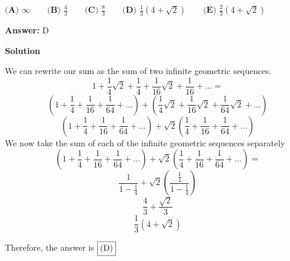 \begin{enumerate}
 $\textbf{(A) } \infty\qquad \textbf{(B) } \frac{4}{3}\qquad \textbf{(C) } \frac{8}{3}\qquad \textbf{(D) } \frac{1}{3}(4+\sqrt{2})\qquad \textbf{(E) } \frac{2}{3}(4+\sqrt{2})$

 \textbf{Answer: }D



\textbf{Solution}

We can rewrite our sum as the sum of two infinite geometric sequences.
 \[1 + \frac{1}{4}\sqrt{2} + \frac{1}{4} + \frac{1}{16}\sqrt{2} + \frac{1}{16} + ... =\]
 \[(1 + \frac{1}{4} + \frac{1}{16} + \frac{1}{64} + ...) + (\frac{1}{4}\sqrt{2} + \frac{1}{16}\sqrt{2} + \frac{1}{64}\sqrt{2} + ...)\]
 \[(1 + \frac{1}{4} + \frac{1}{16} + \frac{1}{64} + ...) + \sqrt{2}(\frac{1}{4} + \frac{1}{16} + \frac{1}{64} + ...)\]We now take the sum of each of the infinite geometric sequences separately
 \[(1 + \frac{1}{4} + \frac{1}{16} + \frac{1}{64} + ...) + \sqrt{2}(\frac{1}{4} + \frac{1}{16} + \frac{1}{64} + ...) =\]
 \[\frac{1}{1 - \frac{1}{4}} + \sqrt{2}(\frac{\frac{1}{4}}{1 - \frac{1}{4}})\]
 \[\frac{4}{3} + \frac{\sqrt{2}}{3}\]
 \[\frac{1}{3}(4 + \sqrt{2})\]

 Therefore, the answer is $\fbox{(D)}$



\end{enumerate}